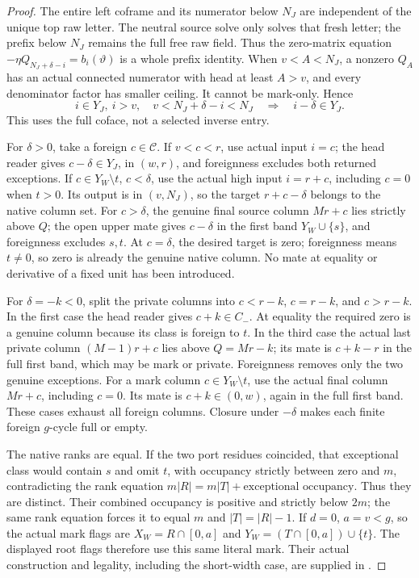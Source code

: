 \documentclass[11pt,a4paper]{amsart}
\numberwithin{equation}{section}
\theoremstyle{plain}
\theoremstyle{definition}
\begin{document}
\begin{proof}
The entire left coframe and its numerator below \(N_J\) are independent
of the unique top raw letter.  The neutral source solve only solves
that fresh letter; the prefix below \(N_J\) remains the full free raw
field.  Thus the zero-matrix equation
\(-\eta Q_{N_J+\delta-i}=b_i(\vartheta)\) is a whole prefix identity.
When \(v<A<N_J\), a nonzero \(Q_A\) has an actual connected numerator
with head at least \(A>v\), and every denominator factor has smaller
ceiling.  It cannot be mark-only.  Hence
\[
 i\in Y_J,\ i>v,\quad v<N_J+\delta-i<N_J
       \quad\Longrightarrow\quad i-\delta\in Y_J.
\]
This uses the full coface, not a selected inverse entry.

For \(\delta>0\), take a foreign \(c\in\mathcal C\).
If \(v<c<r\), use actual input \(i=c\); the head reader gives
\(c-\delta\in Y_J\), in \((w,r)\), and foreignness excludes both
returned exceptions.  If \(c\in Y_W\setminus t\), \(c<\delta\),
use the actual high input \(i=r+c\), including \(c=0\) when \(t>0\).
Its output is in \((v,N_J)\), so the target \(r+c-\delta\) belongs
to the native column set.
For \(c>\delta\), the genuine final source column \(Mr+c\) lies
strictly above \(Q\); the open upper mate gives \(c-\delta\) in the
first band \(Y_W\cup\{s\}\), and foreignness excludes \(s,t\).
At \(c=\delta\), the desired target is zero; foreignness means \(t\ne0\),
so zero is already the genuine native column.  No mate at equality
or derivative of a fixed unit has been introduced.

For \(\delta=-k<0\), split the private columns into
\(c<r-k\), \(c=r-k\), and \(c>r-k\).
In the first case the head reader gives \(c+k\in C_-\).
At equality the required zero is a genuine column because its class
is foreign to \(t\).
In the third case the actual last private column \((M-1)r+c\)
lies above \(Q=Mr-k\); its mate is \(c+k-r\) in the full first
band, which may be mark or private.  Foreignness removes only the
two genuine exceptions.
For a mark column \(c\in Y_W\setminus t\), use the actual final column
\(Mr+c\), including \(c=0\).  Its mate is \(c+k\in(0,w)\), again
in the full first band.  These cases exhaust all foreign columns.
Closure under \(-\delta\) makes each finite foreign \(g\)-cycle
full or empty.

The native ranks are equal.  If the two port residues coincided, that
exceptional class would contain \(s\) and omit \(t\), with occupancy
strictly between zero and \(m\), contradicting the rank equation
\(m|R|=m|T|+\text{exceptional occupancy}\).
Thus they are distinct.  Their combined occupancy is positive and
strictly below \(2m\); the same rank equation forces it to equal \(m\)
and \(|T|=|R|-1\).
If \(d=0\), \(a=v<g\), so the actual mark flags are
\(X_W=R\cap[0,a]\) and \(Y_W=(T\cap[0,a])\cup\{t\}\).
The displayed root flags therefore use this same literal mark.
Their actual construction and legality, including the short-width
case, are supplied in \cite[Mixed residue fold]{Shields2026Gluing}.
\end{proof}
\end{document}
